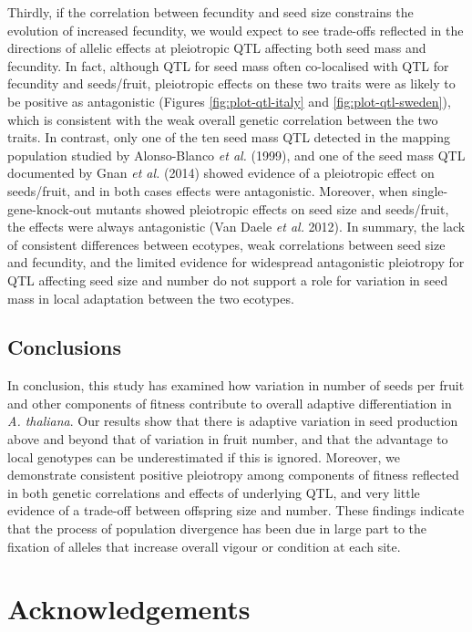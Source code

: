 \documentclass[
]{article}
\begin{document}
Thirdly, if the correlation between fecundity and seed size constrains the evolution of increased fecundity, we would expect to see trade-offs reflected in the directions of allelic effects at pleiotropic QTL affecting both seed mass and fecundity. In fact, although QTL for seed mass often co-localised with QTL for fecundity and seeds/fruit, pleiotropic effects on these two traits were as likely to be positive as antagonistic (Figures \ref{fig:plot-qtl-italy} and \ref{fig:plot-qtl-sweden}), which is consistent with the weak overall genetic correlation between the two traits. In contrast, only one of the ten seed mass QTL detected in the mapping population studied by Alonso-Blanco \emph{et al.} (1999), and one of the seed mass QTL documented by Gnan \emph{et al.} (2014) showed evidence of a pleiotropic effect on seeds/fruit, and in both cases effects were antagonistic. Moreover, when single-gene-knock-out mutants showed pleiotropic effects on seed size and seeds/fruit, the effects were always antagonistic (Van Daele \emph{et al.} 2012). In summary, the lack of consistent differences between ecotypes, weak correlations between seed size and fecundity, and the limited evidence for widespread antagonistic pleiotropy for QTL affecting seed size and number do not support a role for variation in seed mass in local adaptation between the two ecotypes.

\hypertarget{conclusions}{%
\subsection{Conclusions}\label{conclusions}}

In conclusion, this study has examined how variation in number of seeds per fruit and other components of fitness contribute to overall adaptive differentiation in \emph{A. thaliana}. Our results show that there is adaptive variation in seed production above and beyond that of variation in fruit number, and that the advantage to local genotypes can be underestimated if this is ignored. Moreover, we demonstrate consistent positive pleiotropy among components of fitness reflected in both genetic correlations and effects of underlying QTL, and very little evidence of a trade-off between offspring size and number. These findings indicate that the process of population divergence has been due in large part to the fixation of alleles that increase overall vigour or condition at each site.

\hypertarget{acknowledgements}{%
\section{Acknowledgements}\label{acknowledgements}}
\end{document}
